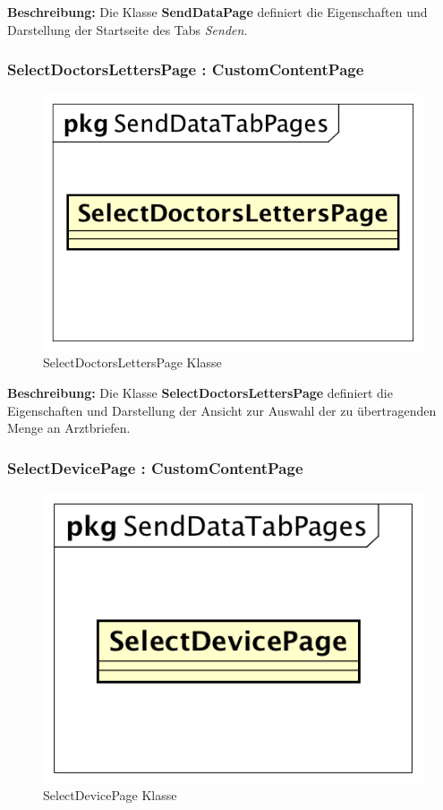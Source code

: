 \documentclass[a4paper]{scrreprt}
\begin{document}
\textbf{Beschreibung:} Die Klasse \textbf{SendDataPage} definiert die Eigenschaften und Darstellung der Startseite des Tabs \textit{Senden}.

\subsubsection{SelectDoctorsLettersPage : CustomContentPage}
\begin{figure}[H]
\centering
\includegraphics[width=0.45\textheight]{graphics/Klassendiagramme/View/SelectDoctorsLettersPage.png}
\caption{SelectDoctorsLettersPage Klasse}
\end{figure}

\textbf{Beschreibung:} Die Klasse \textbf{SelectDoctorsLettersPage} definiert die Eigenschaften und Darstellung der Ansicht zur Auswahl der zu übertragenden Menge an Arztbriefen.

\subsubsection{SelectDevicePage : CustomContentPage}
\begin{figure}[H]
\centering
\includegraphics[width=0.45\textheight]{graphics/Klassendiagramme/View/SelectDevicePage.png}
\caption{SelectDevicePage Klasse}
\end{figure}
\end{document}

